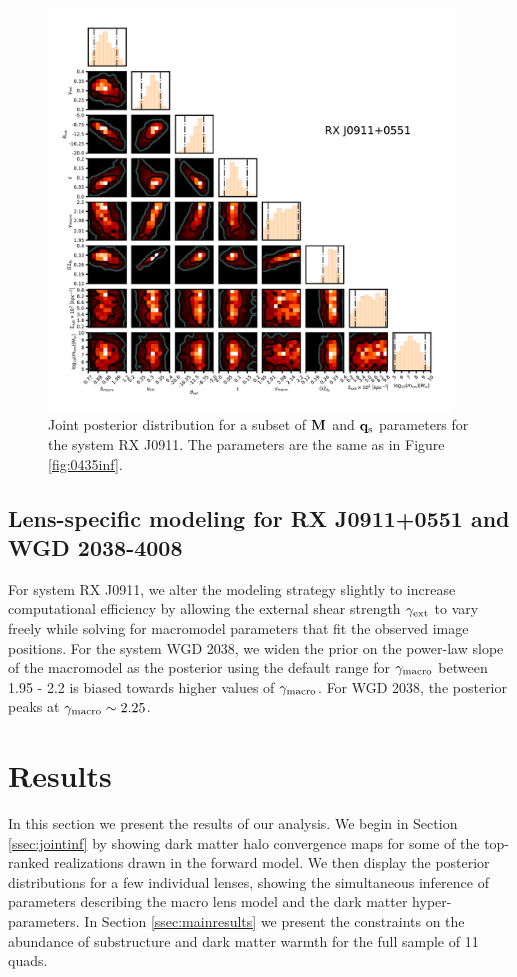 \begin{figure}
	\includegraphics[clip,trim=1.5cm 1.2cm 1cm
	1cm,width=0.95\textwidth,keepaspectratio]{./figures_wdmchillsout//joint0911.pdf}
	\caption{\label{fig:0911inf} Joint posterior distribution for a subset of ${\bf{M}}$ and ${\bf{q}_{\rm{s}}}$ parameters for the system RX J0911. The parameters are the same as in Figure \ref{fig:0435inf}. }
\end{figure}	

\subsection{Lens-specific modeling for RX J0911+0551 and WGD 2038-4008}
\label{ssec:specificmodeling}
For system RX J0911, we alter the modeling strategy slightly to increase computational efficiency by allowing the external shear strength $\gamma_{\rm{ext}}$ to vary freely while solving for macromodel parameters that fit the observed image positions. 
For the system WGD 2038, we widen the prior on the power-law slope of the macromodel as the posterior using the default range for $\gamma_{\rm{macro}}$ between 1.95 - 2.2 is biased towards higher values of $\gamma_{\rm{macro}}$. For WGD 2038, the posterior peaks at $\gamma_{\rm{macro}} \sim 2.25$.  

\section{Results}
\label{sec:results}
In this section we present the results of our analysis. We begin in Section \ref{ssec:jointinf} by showing dark matter halo convergence maps for some of the top-ranked realizations drawn in the forward model. We then display the posterior distributions for a few individual lenses, showing the simultaneous inference of parameters describing the macro lens model and the dark matter hyper-parameters. In Section \ref{ssec:mainresults} we present the constraints on the abundance of substructure and dark matter warmth for the full sample of 11 quads.

